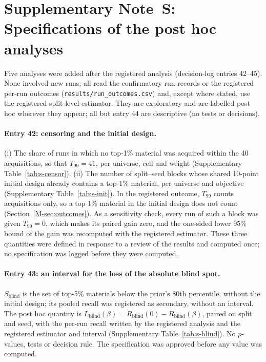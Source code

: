 \documentclass[11pt,a4paper]{article}
\newcommand{\Sblind}{S_{\mathrm{blind}}}
\newcommand{\Tnn}{T_{99}}
\newcounter{snote}
\renewcommand{\thesnote}{S\arabic{snote}}
\newcommand{\snote}[2]{\refstepcounter{snote}\label{#1}\section*{Supplementary Note~\thesnote: #2}}
\begin{document}
\snote{note:posthoc}{Specifications of the post hoc analyses}

Five analyses were added after the registered analysis (decision-log entries 42--45). None involved new runs; all read the
confirmatory run records or the registered per-run outcomes (\texttt{results/run\_outcomes.csv}) and, except where stated, use
the registered split-level estimator. They are exploratory and are labelled post hoc wherever they appear; all but entry 44
are descriptive (no tests or decisions).

\paragraph{Entry 42: censoring and the initial design.} (i) The share of runs in which no top-1\% material was acquired within the
40 acquisitions, so that $\Tnn=41$, per universe, cell and weight (Supplementary Table~\ref{tab:s-censor}). (ii) The number of
split--seed blocks whose shared 10-point initial design already contains a top-1\% material, per universe and objective
(Supplementary Table~\ref{tab:s-init}). In the registered outcome, $\Tnn$ counts acquisitions only, so a top-1\%
material in the initial design does not count (Section~\ref{M-sec:outcomes}). As a sensitivity check, every run of such a block was given $\Tnn=0$, which makes
its paired gain zero, and the one-sided lower 95\% bound of the gain was recomputed with the registered estimator. These three
quantities were defined in response to a review of the results and computed once; no specification was logged before they were
computed.

\paragraph{Entry 43: an interval for the loss of the absolute blind spot.} $\Sblind$ is the set of top-5\% materials below the
prior's 80th percentile, without the initial design; its pooled recall was registered as secondary, without an interval. The post
hoc quantity is $L_{\mathrm{blind}}(\beta)=R_{\mathrm{blind}}(0)-R_{\mathrm{blind}}(\beta)$, paired on split and seed, with the
per-run recall written by the registered analysis and the registered estimator and interval (Supplementary
Table~\ref{tab:s-blind}). No $p$-values, tests or decision rule. The specification was approved before any value was computed.
\end{document}
